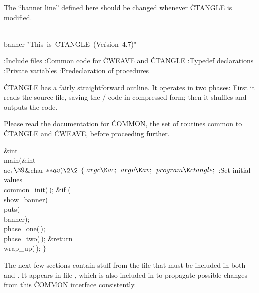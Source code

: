 The ``banner line'' defined here should be changed whenever \.{CTANGLE}
is modified.

\Y\B\4\D\\{banner}\5
\.{"This\ is\ CTANGLE\ (Ve}\)\.{rsion\ 4.7)"}\par
\Y\B{}:Include files\X\6
\ATH\6
:Common code for \.{CWEAVE} and \.{CTANGLE}\X\6
:Typedef declarations\X\6
:Private variables\X\6
:Predeclaration of procedures\X\par
\fi

\.{CTANGLE} has a fairly straightforward outline.  It operates in
two phases: First it reads the source file, saving the \CEE/ code in
compressed form; then it shuffles and outputs the code.

Please read the documentation for \.{COMMON}, the set of routines common
to \.{CTANGLE} and \.{CWEAVE}, before proceeding further.

\Y\B\1\1\&{int} \\{main}(\&{int} \\{ac}${},\39{}$\&{char} ${}{*}{*}\\{av})\2%
\2{}$\6
${}\{{}$\1\6
${}\\{argc}\K\\{ac};{}$\6
${}\\{argv}\K\\{av};{}$\6
${}\\{program}\K\\{ctangle};{}$\6
:Set initial values\X\6
\\{common\_init}(\,);\6
\&{if} (\\{show\_banner})\1\5
\\{puts}(\\{banner});\2\6
\\{phase\_one}(\,);\6
\\{phase\_two}(\,);\6
\&{return} \\{wrap\_up}(\,);\6
\4${}\}{}$\2\par
\fi

The next few sections contain stuff from the file  that
must
be included in both  and . It appears in
file , which is also included in  to
propagate
possible changes from this \.{COMMON} interface consistently.

